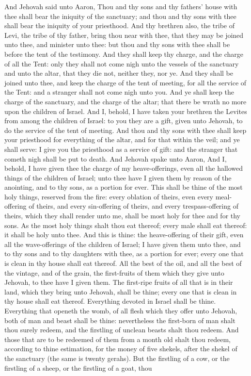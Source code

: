 And Jehovah said unto Aaron, Thou and thy sons and thy fathers’ house with thee shall bear the iniquity of the sanctuary; and thou and thy sons with thee shall bear the iniquity of your priesthood. And thy brethren also, the tribe of Levi, the tribe of thy father, bring thou near with thee, that they may be joined unto thee, and minister unto thee: but thou and thy sons with thee shall be before the tent of the testimony. And they shall keep thy charge, and the charge of all the Tent: only they shall not come nigh unto the vessels of the sanctuary and unto the altar, that they die not, neither they, nor ye. And they shall be joined unto thee, and keep the charge of the tent of meeting, for all the service of the Tent: and a stranger shall not come nigh unto you. And ye shall keep the charge of the sanctuary, and the charge of the altar; that there be wrath no more upon the children of Israel. And I, behold, I have taken your brethren the Levites from among the children of Israel: to you they are a gift, given unto Jehovah, to do the service of the tent of meeting. And thou and thy sons with thee shall keep your priesthood for everything of the altar, and for that within the veil; and ye shall serve: I give you the priesthood as a service of gift: and the stranger that cometh nigh shall be put to death.  And Jehovah spake unto Aaron, And I, behold, I have given thee the charge of my heave-offerings, even all the hallowed things of the children of Israel; unto thee have I given them by reason of the anointing, and to thy sons, as a portion for ever. This shall be thine of the most holy things, reserved from the fire: every oblation of theirs, even every meal-offering of theirs, and every sin-offering of theirs, and every trespass-offering of theirs, which they shall render unto me, shall be most holy for thee and for thy sons. As the most holy things shalt thou eat thereof; every male shall eat thereof: it shall be holy unto thee. And this is thine: the heave-offering of their gift, even all the wave-offerings of the children of Israel; I have given them unto thee, and to thy sons and to thy daughters with thee, as a portion for ever; every one that is clean in thy house shall eat thereof. All the best of the oil, and all the best of the vintage, and of the grain, the first-fruits of them which they give unto Jehovah, to thee have I given them. The first-ripe fruits of all that is in their land, which they bring unto Jehovah, shall be thine; every one that is clean in thy house shall eat thereof. Everything devoted in Israel shall be thine. Everything that openeth the womb, of all flesh which they offer unto Jehovah, both of man and beast shall be thine: nevertheless the first-born of man shalt thou surely redeem, and the firstling of unclean beasts shalt thou redeem. And those that are to be redeemed of them from a month old shalt thou redeem, according to thine estimation, for the money of five shekels, after the shekel of the sanctuary (the same is twenty gerahs). But the firstling of a cow, or the firstling of a sheep, or the firstling of a goat, thou 
